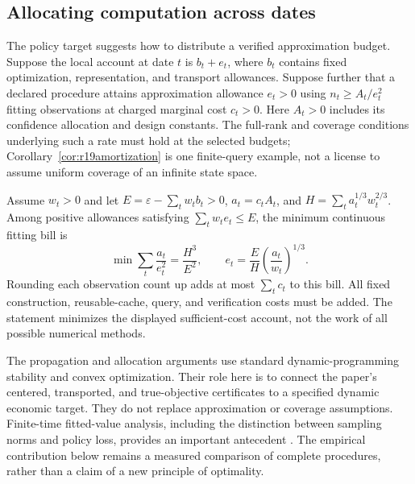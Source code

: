 \subsection{Allocating computation across dates}
The policy target suggests how to distribute a verified approximation budget.
Suppose the local account at date $t$ is $b_t+e_t$, where $b_t$ contains
fixed optimization, representation, and transport allowances. Suppose further
that a declared procedure attains approximation allowance $e_t>0$ using
$n_t\geq A_t/e_t^2$ fitting observations at charged marginal cost $c_t>0$.
Here $A_t>0$ includes its confidence allocation and design constants. The
full-rank and coverage conditions underlying such a rate must hold at the
selected budgets; Corollary~\ref{cor:r19amortization} is one finite-query
example, not a license to assume uniform coverage of an infinite state space.

\begin{proposition}\label{prop:r21allocation}
Assume $w_t>0$ and let
$E=\varepsilon-\sum_t w_tb_t>0$, $a_t=c_tA_t$, and
$H=\sum_ta_t^{1/3}w_t^{2/3}$. Among positive allowances satisfying
$\sum_tw_te_t\leq E$, the minimum continuous fitting bill is
\begin{equation}
 \min\sum_t\frac{a_t}{e_t^2}=\frac{H^3}{E^2},\qquad
 e_t=\frac{E}{H}\left(\frac{a_t}{w_t}\right)^{1/3}.
 \label{eq:r21allocation}
\end{equation}
Rounding each observation count up adds at most $\sum_tc_t$ to this bill.
All fixed construction, reusable-cache, query, and verification costs must
be added. The statement minimizes the displayed sufficient-cost account,
not the work of all possible numerical methods.
\end{proposition}

The propagation and allocation arguments use standard dynamic-programming
stability and convex optimization. Their role here is to connect the paper's
centered, transported, and true-objective certificates to a specified dynamic
economic target. They do not replace approximation or coverage assumptions.
Finite-time fitted-value analysis, including the distinction between sampling
norms and policy loss, provides an important antecedent
\citep{MunosSzepesvari2008}. The empirical contribution below remains a
measured comparison of complete procedures, rather than a claim of a new
principle of optimality.
